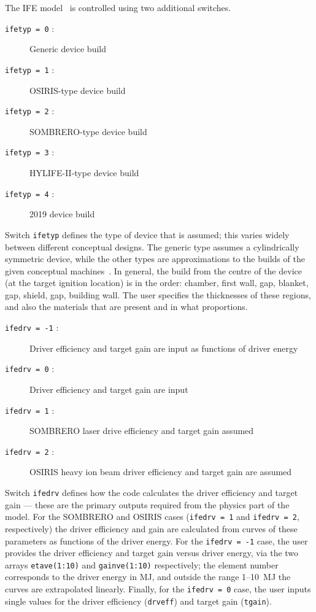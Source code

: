 \documentclass[11pt,a4paper]{report}
\begin{document}
The IFE model~\cite{process_ife} is controlled using two additional switches.
\begin{description}
\item [\texttt{ifetyp = 0} :] Generic device build
\item [\texttt{ifetyp = 1} :] OSIRIS-type device build~\cite{osiris1,osiris2,osiris3}
\item [\texttt{ifetyp = 2} :] SOMBRERO-type device build~\cite{sombrero1,sombrero2}
\item [\texttt{ifetyp = 3} :] HYLIFE-II-type device build~\cite{hylife1,hylife2,hylife3}
\item [\texttt{ifetyp = 4} :] 2019 device build
\end{description}
Switch \texttt{ifetyp} defines the type of device that is assumed; this varies
widely between different conceptual designs. The generic type assumes a
cylindrically symmetric device, while the other types are approximations to
the builds of the given conceptual machines~\cite{ife_build}. In general, the
build from the centre of the device (at the target ignition location) is in
the order: chamber, first wall, gap, blanket, gap, shield, gap, building
wall. The user specifies the thicknesses of these regions, and also the
materials that are present and in what proportions.%
\begin{description}
\item [\texttt{ifedrv = -1} :] Driver efficiency and target gain are input as
  functions of driver energy
\item [\texttt{ifedrv = 0} :] Driver efficiency and target gain are input
\item [\texttt{ifedrv = 1} :] SOMBRERO laser drive efficiency and target gain assumed
\item [\texttt{ifedrv = 2} :] OSIRIS heavy ion beam driver efficiency and
  target gain are assumed~\cite{ife_driver}
\end{description}
Switch \texttt{ifedrv} defines how the code calculates the driver efficiency
and target gain --- these are the primary outputs required from the physics
part of the model. For the SOMBRERO and OSIRIS cases (\texttt{ifedrv = 1} and
\texttt{ifedrv = 2}, respectively) the driver efficiency and gain are
calculated from curves of these parameters as functions of the driver
energy. For the \texttt{ifedrv = -1} case, the user provides the driver
efficiency and target gain versus driver energy, via the two arrays
\texttt{etave(1:10)} and \texttt{gainve(1:10)} respectively; the element number
corresponds to the driver energy in MJ, and outside the range 1--10~MJ the
curves are extrapolated linearly. Finally, for the \texttt{ifedrv = 0} case,
the user inputs single values for the driver efficiency (\texttt{drveff}) and
target gain (\texttt{tgain}).
\end{document}
